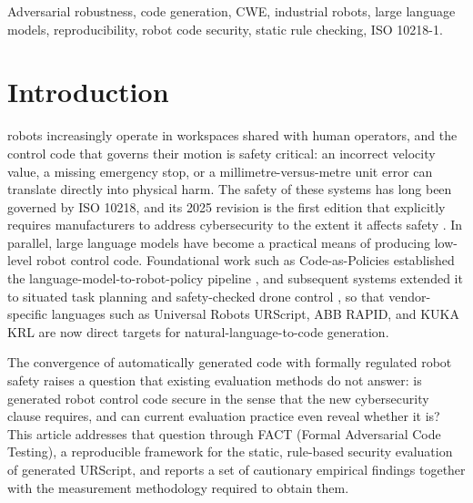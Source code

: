 \documentclass{ieeeaccess}
\begin{document}
\begin{keywords}
Adversarial robustness, code generation, CWE, industrial robots, large language models, reproducibility, robot code security, static rule checking, ISO 10218-1.
\end{keywords}

\titlepgskip=-15pt

\maketitle


\section{Introduction}\label{sec:intro}

 robots increasingly operate in workspaces shared with
human operators, and the control code that governs their motion is safety
critical: an incorrect velocity value, a missing emergency stop, or a
millimetre-versus-metre unit error can translate directly into physical harm. The
safety of these systems has long been governed by ISO 10218, and its 2025
revision is the first edition that explicitly requires manufacturers to address
cybersecurity to the extent it affects safety \cite{ref1}. In parallel, large
language models have become a practical means of producing low-level robot control
code. Foundational work such as Code-as-Policies established the
language-model-to-robot-policy pipeline \cite{ref2}, and subsequent systems
extended it to situated task planning \cite{ref3} and safety-checked drone control \cite{ref4}, so
that vendor-specific languages such as Universal Robots URScript, ABB RAPID, and
KUKA KRL are now direct targets for natural-language-to-code generation.

The convergence of automatically generated code with formally regulated robot
safety raises a question that existing evaluation methods do not answer: is
generated robot control code secure in the sense that the new cybersecurity clause
requires, and can current evaluation practice even reveal whether it is? This article
addresses that question through FACT (Formal Adversarial Code Testing), a reproducible
framework for the static, rule-based security evaluation of generated URScript, and
reports a set of cautionary empirical findings together with the measurement methodology
required to obtain them.
\end{document}
